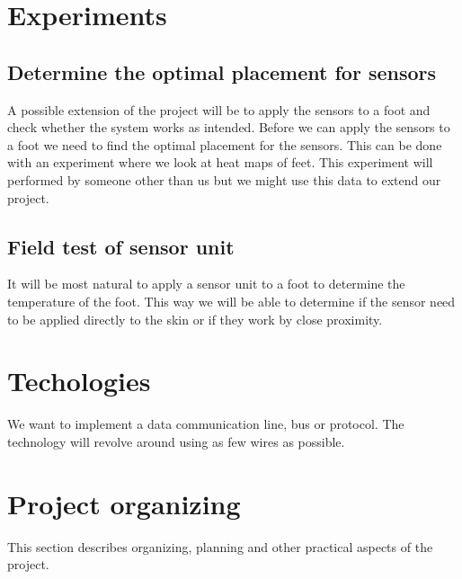 \section{Experiments}
\subsection{Determine the optimal placement for sensors}
A possible extension of the project will be to apply the sensors to a foot and check whether the system works as intended. Before we can apply the sensors to a foot we need to find the optimal placement for the sensors. This can be done with an experiment where we look at heat maps of feet. This experiment will performed by someone other than us but we might use this data to extend our project.

\subsection{Field test of sensor unit}
It will be most natural to apply a sensor unit to a foot to determine the temperature of the foot. This way we will be able to determine if the sensor need to be applied directly to the skin or if they work by close proximity. 

\section{Techologies}
We want to implement a data communication line, bus or protocol. The technology will revolve around using as few wires as possible. 

\section{Project organizing}
This section describes organizing, planning and other practical aspects of the project.

